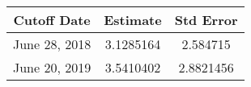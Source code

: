 
\begin{tabular}{ccc}
    Cutoff Date     &   Estimate   &   Std Error \\ \toprule
    June 28, 2018   &   3.1285164        &   2.584715 \\
    June 20, 2019   &   3.5410402        &   2.8821456 \\ \bottomrule
\end{tabular}
